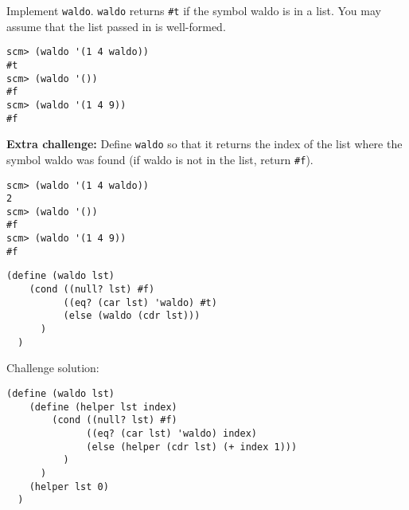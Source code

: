 \begin{blocksection}
\question Implement \texttt{waldo}. \texttt{waldo} returns \texttt{\#t} if the
symbol waldo is in a list. You may assume that the list passed in is
well-formed.\\

\begin{lstlisting}
scm> (waldo '(1 4 waldo))
#t
scm> (waldo '())
#f
scm> (waldo '(1 4 9))
#f
\end{lstlisting}

\textbf{Extra challenge:} Define \texttt{waldo} so that it returns the index of
the list where the symbol waldo was found (if waldo is not in the list, return
\texttt{\#f}).
\begin{lstlisting}
scm> (waldo '(1 4 waldo))
2
scm> (waldo '())
#f
scm> (waldo '(1 4 9))
#f
\end{lstlisting}

\begin{solution}[0.5in]
\begin{lstlisting}
(define (waldo lst)
    (cond ((null? lst) #f)
          ((eq? (car lst) 'waldo) #t)
          (else (waldo (cdr lst)))
      )
  )
\end{lstlisting}

Challenge solution:
\begin{lstlisting}
(define (waldo lst)
    (define (helper lst index)
        (cond ((null? lst) #f)
              ((eq? (car lst) 'waldo) index)
              (else (helper (cdr lst) (+ index 1)))
          )
      )
    (helper lst 0)
  )
\end{lstlisting}
\end{solution}

\end{blocksection}
